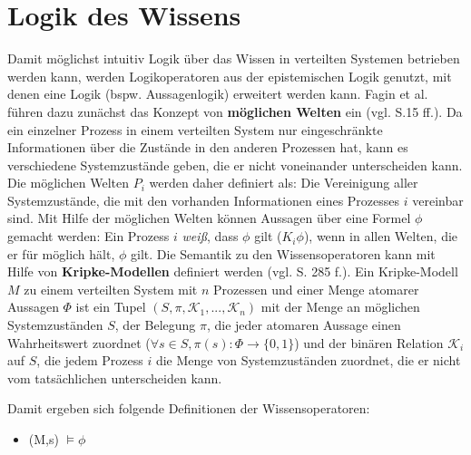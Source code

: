 \section{Logik des Wissens}
\label{Logik}
Damit möglichst intuitiv Logik über das Wissen in verteilten Systemen betrieben werden kann, werden Logikoperatoren aus der epistemischen Logik genutzt, mit denen eine Logik (bspw. Aussagenlogik) erweitert werden kann. 
Fagin et al. führen dazu zunächst das Konzept von \textbf{möglichen Welten} ein (vgl. \cite{fagin2003reasoning} S.15 ff.). 
Da ein einzelner Prozess in einem verteilten System nur eingeschränkte Informationen über die Zustände in den anderen Prozessen hat, kann es verschiedene Systemzustände geben, die er nicht voneinander unterscheiden kann. Die möglichen Welten $P_i$ werden daher definiert als: Die Vereinigung aller Systemzustände, die mit den vorhanden Informationen eines Prozesses $i$ vereinbar sind.
Mit Hilfe der möglichen Welten können Aussagen über eine Formel $\phi$ gemacht werden:
Ein Prozess $i$ \textit{weiß}, dass $\phi$ gilt ($K_i\phi$), wenn in allen Welten, die er für möglich hält, $\phi$ gilt.
Die Semantik zu den Wissensoperatoren kann mit Hilfe von \textbf{Kripke-Modellen} definiert werden (vgl. \cite{kshemkalyani2011distributed} S. 285 f.).
Ein Kripke-Modell $M$ zu einem verteilten System mit $n$ Prozessen und einer Menge atomarer Aussagen $\Phi$ ist ein Tupel $(S,\pi,\mathcal{K}_1,...,\mathcal{K}_n)$ mit der Menge an möglichen Systemzuständen $S$, der Belegung $\pi$, die jeder atomaren Aussage einen Wahrheitswert zuordnet ($\forall s\in S, \pi(s):\Phi \rightarrow \{0,1\}$) und der binären Relation $\mathcal{K}_i$ auf $S$, die jedem Prozess $i$ die Menge von Systemzuständen zuordnet, die er nicht vom tatsächlichen unterscheiden kann.\medskip

Damit ergeben sich folgende Definitionen der Wissensoperatoren:
\begin{itemize}
	\item (M,s) $\vDash \phi$
\end{itemize}
